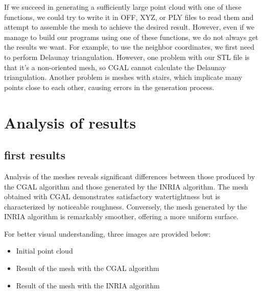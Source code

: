 \documentclass{article}
\begin{document}
If we succeed in generating a sufficiently large point cloud with one of these functions, we could try to write it in OFF, XYZ, or PLY files to read them and attempt to assemble the mesh to achieve the desired result.
 However, even if we manage to build our programs using one of these functions, we do not always get the results we want.
  For example, to use the neighbor coordinates, we first need to perform Delaunay triangulation. However, one problem with our STL file is that it's a non-oriented mesh, 
  so CGAL cannot calculate the Delaunay triangulation. Another problem is meshes with stairs, which implicate many points close to each other, causing errors in the generation process.



\section{Analysis of results}
\subsection{first results}
Analysis of the meshes reveals significant differences between those produced by the CGAL algorithm and those generated by the INRIA algorithm. The mesh obtained with CGAL demonstrates satisfactory watertightness but is characterized by noticeable roughness. Conversely, the mesh generated by the INRIA algorithm is remarkably smoother, offering a more uniform surface.

For better visual understanding, three images are provided below:

\begin{itemize}
    \item Initial point cloud
    \item Result of the mesh with the CGAL algorithm
    \item Result of the mesh with the INRIA algorithm
\end{itemize}
\end{document}
